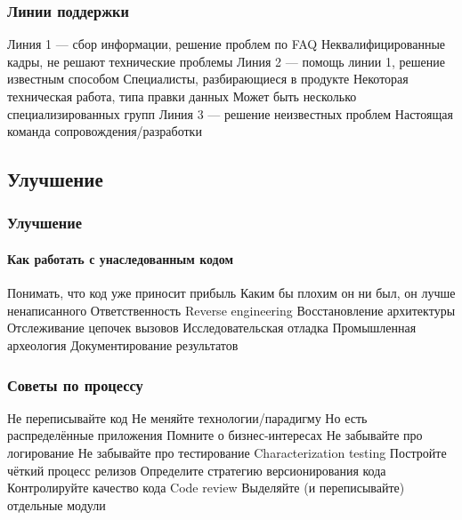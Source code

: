 \documentclass{../../slides-style}
\begin{document}
    \begin{frame}
        \frametitle{Линии поддержки}
        \begin{outline}
            \1 Линия 1 --- сбор информации, решение проблем по FAQ
                \2 Неквалифицированные кадры, не решают технические проблемы
            \1 Линия 2 --- помощь линии 1, решение известным способом
                \2 Специалисты, разбирающиеся в продукте
                \2 Некоторая техническая работа, типа правки данных
                \2 Может быть несколько специализированных групп
            \1 Линия 3 --- решение неизвестных проблем
                \2 Настоящая команда сопровождения/разработки
        \end{outline}
    \end{frame}

    \subsection{Улучшение}

    \begin{frame}
        \frametitle{Улучшение}
        \framesubtitle{Как работать с унаследованным кодом}
        \begin{outline}
            \1 Понимать, что код уже приносит прибыль
                \2 Каким бы плохим он ни был, он лучше ненаписанного
                \2 Ответственность
            \1 Reverse engineering
                \2 Восстановление архитектуры
                \2 Отслеживание цепочек вызовов
                \2 Исследовательская отладка
                \2 Промышленная археология
                \2 Документирование результатов
        \end{outline}
    \end{frame}

    \begin{frame}
        \frametitle{Советы по процессу}
        \begin{outline}
            \1 Не переписывайте код
            \1 Не меняйте технологии/парадигму
                \2 Но есть распределённые приложения
            \1 Помните о бизнес-интересах
            \1 Не забывайте про логирование
            \1 Не забывайте про тестирование
                \2 Characterization testing
            \1 Постройте чёткий процесс релизов
            \1 Определите стратегию версионирования кода
            \1 Контролируйте качество кода
                \2 Code review
            \1 Выделяйте (и переписывайте) отдельные модули
        \end{outline}
    \end{frame}
\end{document}
